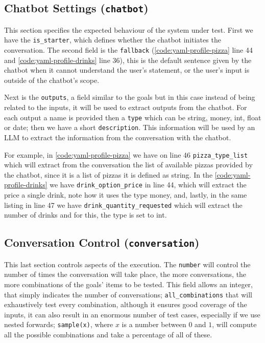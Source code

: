 \subsection{Chatbot Settings (\texttt{chatbot})}

This section specifies the expected behaviour of the system under test.
First we have the \texttt{is\_starter},
which defines whether the chatbot initiates the conversation.
The second field is the \texttt{fallback}
(\autoref{code:yaml-profile-pizza} line 44
and \autoref{code:yaml-profile-drinks} line 36),
this is the default sentence given by the chatbot
when it cannot understand the user's statement,
or the user's input is outside of the chatbot's scope.

Next is the \texttt{outputs}, a field similar to the goals
but in this case instead of being related to the inputs,
it will be used to extract outputs from the chatbot.
For each output a name is provided
then a \texttt{type} which can be string, money, int, float or date;
then we have a short \texttt{description}.
This information will be used by an \ac{LLM}
to extract the information from the conversation with the chatbot.

For example, in \autoref{code:yaml-profile-pizza} we have on line 46
\texttt{pizza\_type\_list} which will extract from the conversation
the list of available pizzas provided by the chatbot,
since it is a list of pizzas it is defined as string.
In the \autoref{code:yaml-profile-drinks} we have
\texttt{drink\_option\_price} in line 44,
which will extract the price a single drink,
note how it uses the type money,
and, lastly, in the same listing in line 47
we have \texttt{drink\_quantity\_requested}
which will extract the number of drinks
and for this, the type is set to int.


\subsection{Conversation Control (\texttt{conversation})}

This last section controls aspects of the execution.
The \texttt{number} will control the number of times the conversation will take place,
the more conversations, the more combinations of the goals' items to be tested.
This field allows an integer, that simply indicates the number of conversations;
\texttt{all\_combinations} that will exhaustively test every combination,
although it ensures good coverage of the inputs,
it can also result in an enormous number of test cases,
especially if we use nested forwards;
\texttt{sample(x)}, where $x$ is a number between $0$ and $1$,
will compute all the possible combinations
and take a percentage of all of these.

